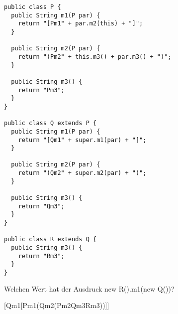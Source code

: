 \begin{lstlisting}
public class P {
  public String m1(P par) {
    return "[Pm1" + par.m2(this) + "]";
  }

  public String m2(P par) {
    return "(Pm2" + this.m3() + par.m3() + ")";
  }

  public String m3() {
    return "Pm3";
  }
}

public class Q extends P {
  public String m1(P par) {
    return "[Qm1" + super.m1(par) + "]";
  }

  public String m2(P par) {
    return "(Qm2" + super.m2(par) + ")";
  }

  public String m3() {
    return "Qm3";
  }
}

public class R extends Q {
  public String m3() {
    return "Rm3";
  }
}
\end{lstlisting}

Welchen Wert hat der Ausdruck new R().m1(new Q())?

[Qm1[Pm1(Qm2(Pm2Qm3Rm3))]]